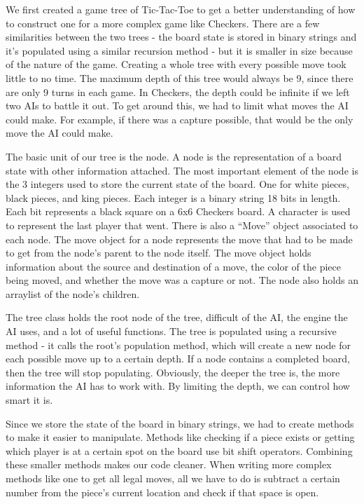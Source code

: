 \documentclass[12pt]{article}
\begin{document}
We first created a game tree of Tic-Tac-Toe to get a better understanding of how to construct one for a more complex game like Checkers. There are a few similarities between the two trees - the board state is stored in binary strings and it’s populated using a similar recursion method - but it is smaller in size because of the nature of the game. Creating a whole tree with every possible move took little to no time. The maximum depth of this tree would always be 9, since there are only 9 turns in each game. In Checkers, the depth could be infinite if we left two AIs to battle it out. To get around this, we had to limit what moves the AI could make. For example, if there was a capture possible, that would be the only move the AI could make.\par
The basic unit of our tree is the node. A node is the representation of a board state with other information attached. The most important element of the node is the 3 integers used to store the current state of the board. One for white pieces, black pieces, and king pieces. Each integer is a binary string 18 bits in length. Each bit represents a black square on a 6x6 Checkers board. A character is used to represent the last player that went. There is also a “Move” object associated to each node. The move object for a node represents the move that had to be made to get from the node’s parent to the node itself. The move object holds information about the source and destination of a move, the color of the piece being moved, and whether the move was a capture or not. The node also holds an arraylist of the node’s children.\par
The tree class holds the root node of the tree, difficult of the AI, the engine the AI uses, and a lot of useful functions. The tree is populated using a recursive method - it calls the root’s population method, which will create a new node for each possible move up to a certain depth. If a node contains a completed board, then the tree will stop populating. Obviously, the deeper the tree is, the more information the AI has to work with. By limiting the depth, we can control how smart it is.\par
Since we store the state of the board in binary strings, we had to create methods to make it easier to manipulate. Methods like checking if a piece exists or getting which player is at a certain spot on the board use bit shift operators. Combining these smaller methods makes our code cleaner. When writing more complex methods like one to get all legal moves, all we have to do is subtract a certain number from the piece’s current location and check if that space is open.\par
\end{document}
